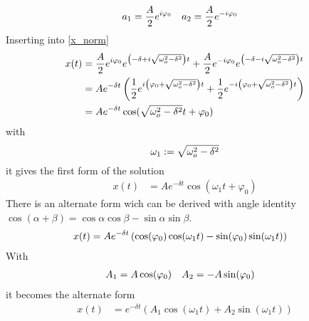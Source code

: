 \begin{align}
a_1 &= \frac{A}{2} e^{i\varphi_0} && a_2 = \frac{A}{2} e^{-i\varphi_0} \notag
\end{align}
Inserting into \eqref{x_norm}
\begin{align}
x(t) &= \frac{A}{2} e^{i\varphi_0}e^{\left(-\delta+i\sqrt{\omega_o^2-\delta^2} \right)t} + \frac{A}{2} e^{-i\varphi_0}e^{\left(-\delta-i\sqrt{\omega_o^2-\delta^2} \right)t}\notag\\
 &= Ae^{-\delta t} \left(\frac{1}{2} e^{i\left(\varphi_0+\sqrt{\omega_o^2-\delta^2}\right)t} + \frac{1}{2} e^{-i\left(\varphi_0+\sqrt{\omega_o^2-\delta^2}\right)t} \right)\notag\\
  &= Ae^{-\delta t}\cos(\sqrt{\omega_o^2-\delta^2}t + \varphi_0)\notag
\end{align}
with
\begin{equation}
\omega_1 := \sqrt{\omega_o^2-\delta^2}
\notag
\end{equation}
it gives the first form of the solution
\begin{align}
x(t) &= Ae^{-\delta t}\cos(\omega_1 t + \varphi_0)\label{x(t)_1}
\end{align}
There is an alternate form wich can be derived with angle identity \(\cos(\alpha + \beta) = \cos \alpha \cos \beta - \sin \alpha \sin \beta \).
\begin{align}
x(t) &= Ae^{-\delta t}\left( \cos(\varphi_0)\cos(\omega_1 t) - \sin(\varphi_0)\sin(\omega_1 t) \right) \notag
\end{align}
With
\begin{align}
A_1 &= A\cos(\varphi_0) && A_2 = -A\sin(\varphi_0) \notag
\end{align}
it becomes the alternate form
\begin{align}
x(t) &= e^{-\delta t}\left(A_1 \cos(\omega_1 t) + A_2 \sin(\omega_1 t) \right) \label{x(t)_2}
\end{align}